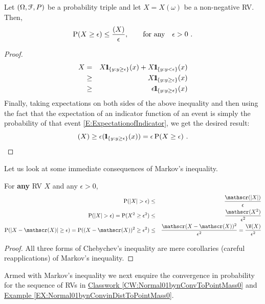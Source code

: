 \begin{prop}
Let $(\Omega,\mathcal{F},P)$ be a probability triple and let $X=X(\omega)$ be a non-negative RV.  Then,
\begin{equation}\label{E:MarkovNeq}
\operatorname{{P}}(X \geq \epsilon) \leq \frac{\mathscr{(}X)}{\epsilon}, \qquad \text{for any} \quad \epsilon > 0 \ .
\end{equation}
{\normalsize
\begin{proof}
\begin{eqnarray}
X &=& X \BB{1}_{ \{y: y \geq \epsilon \} } (x) + X \BB{1}_{ \{y: y < \epsilon \} } (x) \notag \\
&\geq& X \BB{1}_{ \{y: y \geq \epsilon \} } (x) \notag \\
&\geq& \epsilon  \BB{1}_{ \{y: y \geq \epsilon \} } (x) \notag \\
\end{eqnarray}
Finally, taking expectations on both sides of the above inequality and then using the fact that the expectation of an indicator function of an event is simply the probability of that event \eqref{E:ExpectationofIndicator}, we get the desired result:
\[
\mathscr{(}X) \geq \epsilon \mathscr{(} {1}\mspace{-11 mu}{1}_{ \{y: y \geq \epsilon \} } (x)) = \epsilon \operatorname{{P}}(X \geq \epsilon) \ .
\]
\end{proof}
}
\end{prop}
Let us look at some immediate consequences of Markov's inequality.
\begin{prop}
For {\bf any} RV $X$ and any $\epsilon > 0$,
\begin{eqnarray}
\P(|X| > \epsilon) &\leq& \frac{\E(|X|)}{\epsilon} \label{E:ChebychevNeq1} \\
\P(|X| > \epsilon) = \P(X^2 \geq \epsilon^2) &\leq& \frac{\E(X^2)}{\epsilon^2} \label{E:ChebychevNeq2} \\
\P(|X-\E(X)| \geq \epsilon) = \P((X-\E(X))^2 \geq \epsilon^2) &\leq& \frac{\E(X-\E(X))^2}{\epsilon^2}  = \frac{\V(X)}{\epsilon^2}  \label{E:ChebychevNeq3} 
\end{eqnarray}
{\normalsize
\begin{proof}
All three forms of Chebychev's inequality are mere corollaries (careful reapplications) of Markov's inequality.
\end{proof}
}
\end{prop}

Armed with Markov's inequality we next enquire the convergence in probability for the sequence of RVs in \hyperref[CW:Normal01bynConvToPointMass0]{Classwork \ref*{CW:Normal01bynConvToPointMass0}} and \hyperref[EX:Normal01bynConvinDistToPointMass0]{Example \ref*{EX:Normal01bynConvinDistToPointMass0}}.

